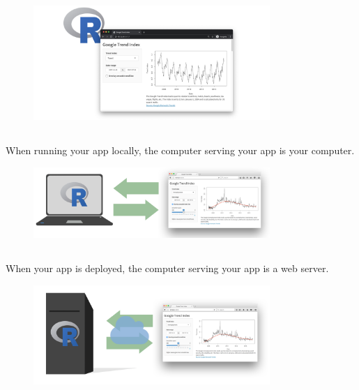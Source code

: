 \documentclass[
  letterpaper,
  DIV=11,
  numbers=noendperiod]{scrreprt}
\begin{document}
\begin{figure}

{\centering \includegraphics[width=0.8\textwidth,height=\textheight]{./images/recap-1.png}

}

\end{figure}

\hypertarget{section-23}{%
\subsection{}\label{section-23}}

When running your app locally, the computer serving your app is your
computer.

\begin{figure}

{\centering \includegraphics[width=0.8\textwidth,height=\textheight]{./images/recap-2.png}

}

\end{figure}

\hypertarget{section-24}{%
\subsection{}\label{section-24}}

When your app is deployed, the computer serving your app is a web
server.

\begin{figure}

{\centering \includegraphics[width=0.8\textwidth,height=\textheight]{./images/recap-3.png}

}

\end{figure}
\end{document}
